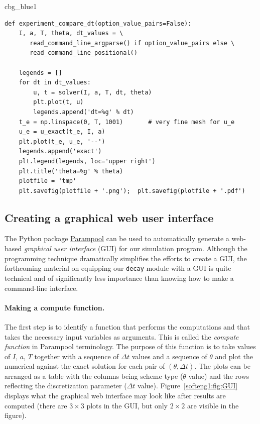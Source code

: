 \documentclass[%
oneside,                 %
final,                   %
10pt]{article}
\newenvironment{_cod_tight}[1]{
   \def\FrameCommand{\colorbox{#1}}
   \FrameRule0.6pt\MakeFramed {\FrameRestore}\vskip3mm}
   {\vskip0mm\endMakeFramed}
\newenvironment{cod}[1]{
\bgroup\rmfamily
\fboxsep=0mm\relax
\begin{_cod_tight}{#1}
\list{}{\parsep=-2mm\parskip=0mm\topsep=0pt\leftmargin=2mm
\rightmargin=2\leftmargin\leftmargin=4pt\relax}
\item\relax}
{\endlist\end{_cod_tight}\egroup}
\begin{document}
\begin{cod}{cbg_blue1}\begin{Verbatim}[numbers=none,fontsize=\fontsize{9pt}{9pt},baselinestretch=0.95,xleftmargin=2mm]
def experiment_compare_dt(option_value_pairs=False):
    I, a, T, theta, dt_values = \ 
       read_command_line_argparse() if option_value_pairs else \ 
       read_command_line_positional()

    legends = []
    for dt in dt_values:
        u, t = solver(I, a, T, dt, theta)
        plt.plot(t, u)
        legends.append('dt=%g' % dt)
    t_e = np.linspace(0, T, 1001)       # very fine mesh for u_e
    u_e = u_exact(t_e, I, a)
    plt.plot(t_e, u_e, '--')
    legends.append('exact')
    plt.legend(legends, loc='upper right')
    plt.title('theta=%g' % theta)
    plotfile = 'tmp'
    plt.savefig(plotfile + '.png');  plt.savefig(plotfile + '.pdf')
\end{Verbatim}
\end{cod}
\noindent


\subsection{Creating a graphical web user interface}

The Python package \href{{https://github.com/hplgit/parampool}}{Parampool}
can be used to automatically generate a web-based \emph{graphical user interface}
(GUI) for our simulation program. Although the programming technique
dramatically simplifies the efforts to create a GUI, the forthcoming
material on equipping our \texttt{decay} module with a GUI is quite technical
and of significantly less importance than knowing how to make
a command-line interface.

\paragraph{Making a compute function.}
The first step is to identify a function
that performs the computations and that takes the necessary input
variables as arguments. This is called the \emph{compute function} in
Parampool terminology. The purpose of this function is to take
values of $I$, $a$, $T$ together with a sequence of $\Delta t$ values
and a sequence of $\theta$ and plot the numerical against the
exact solution for each pair of $(\theta, \Delta t)$.
The plots can be arranged as a table with the columns being scheme type
($\theta$ value) and the rows reflecting the discretization parameter
($\Delta t$ value). Figure~\ref{softeng1:fig:GUI} displays what the
graphical web interface may look like after results are computed
(there are $3\times 3$ plots in the GUI, but only $2\times 2$ are
visible in the figure).
\end{document}
